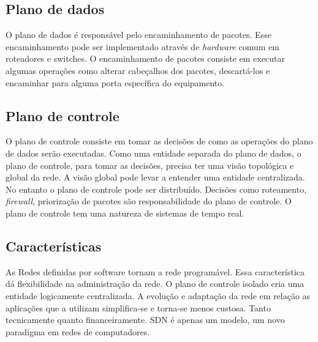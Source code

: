 \subsection{Plano de dados}

O plano de dados é responsável pelo encaminhamento de pacotes. 
Esse encaminhamento pode ser implementado através de \emph{hardware} 
comum em roteadores e switches. 
O encaminhamento de pacotes consiste em executar algumas operações 
como alterar cabeçalhos dos pacotes, descartá-los e encaminhar para alguma 
porta específica do equipamento.

\subsection{Plano de controle}

O plano de controle consiste em tomar as decisões de como as operações do 
plano de dados serão executadas.
Como uma entidade separada do plano de dados, o plano de controle, para 
tomar as decisões, precisa ter uma visão topológica e global da rede. 
A visão global pode levar a entender uma entidade centralizada. 
No entanto o plano de controle pode ser distribuído. 
Decisões como roteamento, \emph{firewall}, priorização de pacotes são 
responsabilidade do plano de controle.
O plano de controle tem uma natureza de sistemas de tempo real.

\subsection{Características}

As Redes definidas por software tornam a rede programável.
Essa característica dá flexibilidade na administração da rede.
O plano de controle isolado cria uma entidade logicamente centralizada.
A evolução e adaptação da rede em relação as aplicações que a utilizam 
simplifica-se e torna-se menos custosa. 
Tanto tecnicamente quanto financeiramente.
SDN é apenas um modelo, um novo paradigma em redes de computadores.
